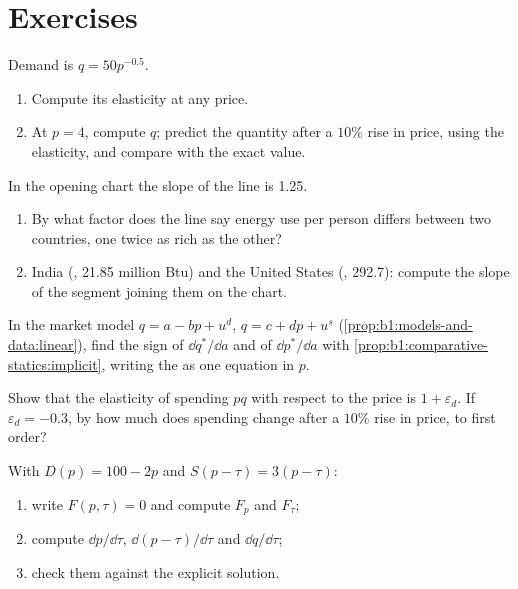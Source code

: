 \section*{Exercises}\label{sec:b1:comparative-statics:exercises}

\begin{exercise}[$\star$]\label{exo:b1:comparative-statics:ce}
Demand is $q = 50p^{-0.5}$.
\begin{enumerate}
  \item Compute its elasticity at any price.
  \item At $p = 4$, compute $q$; predict the quantity after a $10\%$ rise in price, using the elasticity, and compare with the exact value.
\end{enumerate}
\end{exercise}

\begin{exercise}[$\star$]\label{exo:b1:comparative-statics:read-slope}
In the opening chart the slope of the line is 1.25. %
\begin{enumerate}
  \item By what factor does the line say energy use per person differs between two countries, one twice as rich as the other?
  \item India (, 21.85 million Btu) and the United States (, 292.7): compute the slope of the segment joining them on the chart. %
\end{enumerate}
\end{exercise}

\begin{exercise}[$\star$]\label{exo:b1:comparative-statics:demand-shift}
In the market model $q = a - bp + u^d$, $q = c + dp + u^s$
(\cref{prop:b1:models-and-data:linear}), find the sign of
$\dd q^*/\dd a$ and of $\dd p^*/\dd a$ with \cref{prop:b1:comparative-statics:implicit},
writing the  as one equation in $p$.
\end{exercise}

\begin{exercise}[$\star$]\label{exo:b1:comparative-statics:spending}
Show that the elasticity of spending $pq$ with respect to the price is
$1 + \varepsilon_d$. If $\varepsilon_d = -0.3$, by how much does spending change
after a $10\%$ rise in price, to first order?
\end{exercise}

\begin{exercise}[$\star\star$]\label{exo:b1:comparative-statics:implicit-tax}
With $D(p) = 100 - 2p$ and $S(p - \tau) = 3(p - \tau)$:
\begin{enumerate}
  \item write $F(p, \tau) = 0$ and compute $F_p$ and $F_\tau$;
  \item compute $\dd p/\dd\tau$, $\dd(p - \tau)/\dd\tau$ and $\dd q/\dd\tau$;
  \item check them against the explicit solution.
\end{enumerate}
\end{exercise}

